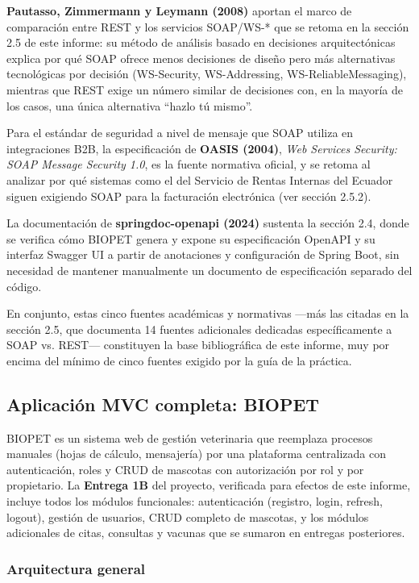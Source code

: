 \documentclass[11pt,a4paper]{article}
\begin{document}
\textbf{Pautasso, Zimmermann y Leymann (2008)} aportan el marco de
comparación entre REST y los servicios SOAP/WS-* que se retoma en la
sección 2.5 de este informe: su método de análisis basado en decisiones
arquitectónicas explica por qué SOAP ofrece menos decisiones de diseño pero
más alternativas tecnológicas por decisión (WS-Security, WS-Addressing,
WS-ReliableMessaging), mientras que REST exige un número similar de
decisiones con, en la mayoría de los casos, una única alternativa
``hazlo tú mismo''.

Para el estándar de seguridad a nivel de mensaje que SOAP utiliza en
integraciones B2B, la especificación de \textbf{OASIS (2004)},
\emph{Web Services Security: SOAP Message Security 1.0}, es la fuente
normativa oficial, y se retoma al analizar por qué sistemas como el del
Servicio de Rentas Internas del Ecuador siguen exigiendo SOAP para la
facturación electrónica (ver sección 2.5.2).

La documentación de \textbf{springdoc-openapi (2024)} sustenta la sección
2.4, donde se verifica cómo BIOPET genera y expone su especificación
OpenAPI y su interfaz Swagger UI a partir de anotaciones y configuración de
Spring Boot, sin necesidad de mantener manualmente un documento de
especificación separado del código.

En conjunto, estas cinco fuentes académicas y normativas —más las citadas
en la sección 2.5, que documenta 14 fuentes adicionales dedicadas
específicamente a SOAP vs. REST— constituyen la base bibliográfica de este
informe, muy por encima del mínimo de cinco fuentes exigido por la guía de
la práctica.

\subsection{Aplicación MVC completa: BIOPET}

BIOPET es un sistema web de gestión veterinaria que reemplaza procesos
manuales (hojas de cálculo, mensajería) por una plataforma centralizada con
autenticación, roles y CRUD de mascotas con autorización por rol y por
propietario. La \textbf{Entrega 1B} del proyecto, verificada para efectos
de este informe, incluye todos los módulos funcionales: autenticación
(registro, login, refresh, logout), gestión de usuarios, CRUD completo de
mascotas, y los módulos adicionales de citas, consultas y vacunas que se
sumaron en entregas posteriores.

\subsubsection{Arquitectura general}
\end{document}
